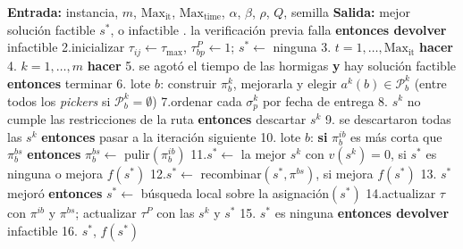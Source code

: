 \startplacefigure[title={Pseudocódigo de \ac{aco}.}, reference=fig:aco_pseudocodigo]
\startframedtext[width=broad, frame=on, align=flushleft]
\startlines
{\bf Entrada:} instancia, $m$, $\text{Max}_{\text{it}}$, $\text{Max}_{\text{time}}$, $\alpha$, $\beta$, $\rho$, $Q$, semilla
{\bf Salida:} mejor solución factible $s^*$, o infactible
. la verificación previa falla {\bf entonces devolver} infactible
2.\quad inicializar $\tau_{ij} \leftarrow \tau_{\max}$, $\tau^{P}_{bp} \leftarrow 1$;\; $s^* \leftarrow$ ninguna
3. $t = 1, \dots, \text{Max}_{\text{it}}$ {\bf hacer}
4.\quad{} $k = 1, \dots, m$ {\bf hacer}
5.\quad\qquad{} se agotó el tiempo de las hormigas {\bf y} hay solución factible {\bf entonces} terminar
6.\quad\qquad{} lote $b$: construir $\pi^k_b$, mejorarla y elegir $a^k(b) \in \mathcal{P}^k_b$ (entre todos los {\em pickers} si $\mathcal{P}^k_b = \emptyset$)
7.\quad\qquad\qquad ordenar cada $\sigma^k_p$ por fecha de entrega
8.\quad\qquad{} $s^k$ no cumple las restricciones de la ruta {\bf entonces} descartar $s^k$
9.\quad{} se descartaron todas las $s^k$ {\bf entonces} pasar a la iteración siguiente
10.\quad{} lote $b$: {\bf si} $\pi^{ib}_b$ es más corta que $\pi^{bs}_b$ {\bf entonces} $\pi^{bs}_b \leftarrow$ pulir$(\pi^{ib}_b)$
11.\quad\qquad $s^* \leftarrow$ la mejor $s^k$ con $v(s^k) = 0$, si $s^*$ es ninguna o mejora $f(s^*)$
12.\quad\qquad $s^* \leftarrow$ recombinar$(s^*, \pi^{bs})$, si mejora $f(s^*)$
13.\quad{} $s^*$ mejoró {\bf entonces} $s^* \leftarrow$ búsqueda local sobre la asignación$(s^*)$
14.\quad\qquad actualizar $\tau$ con $\pi^{ib}$ y $\pi^{bs}$;\; actualizar $\tau^{P}$ con las $s^k$ y $s^*$
15. $s^*$ es ninguna {\bf entonces devolver} infactible
16. $s^*$, $f(s^*)$
\stoplines
\stopframedtext
\stopplacefigure

\startsubsection[title={Construcción de cada solución}, reference=sec:aco_construccion]


